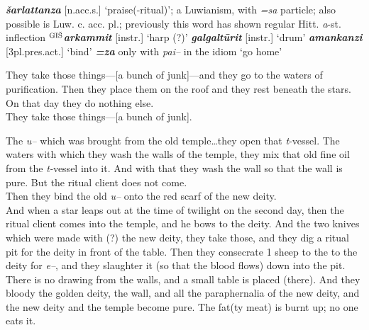\documentclass[10pt]{article}
\newcommand{\supersc}[1]{$^{\textrm{\scriptsize{#1}}}$}  	%
\newcommand{\bit}[1]{\textbf{\textit{#1}}}				%
\newcommand{\p}[1]{{\tiny[{#1}]}}					%
\newcommand{\hith}{\textsubwedge{h}}
\newcommand{\wood}{\supersc{GI\v{S}}}
\renewcommand{\.}[1]{\textsubdot{#1}}
\begin{document}
\begin{description}
\begin{notes}
\bit{\v{s}arlattanza} \p{n.acc.s.} `praise(-ritual)'; a Luwianism, with \textit{=sa} particle; also possible is Luw. c. acc. pl.; previously this word has shown regular Hitt. \textit{a}-st. inflection \textbf{\wood}\bit{arkammit} \p{instr.} `harp (?)' \bit{galgalt\=urit} \p{instr.} `drum' \bit{{\hith}amankanzi} \p{3pl.pres.act.} `bind' \bit{=za} only with \textit{pai--} in the idiom `go home'


\end{notes}


\item[\S\S29--30 :] They take those things---[a bunch of junk]---and they go to the waters of purification. Then they place them on the roof and they rest beneath the stars. On that day they do nothing else.  \\

They take those things---[a bunch of junk].


\begin{notes}



\end{notes}



\item[\S\S31--33 :] The \textit{u--} which was brought from the old temple{\ldots}they open that \textit{t}-vessel. The waters with which they wash the walls of the temple, they mix that old fine oil from the \textit{t-}vessel into it. And with that they wash the wall so that the wall is pure. But the ritual client does not come. \\

Then they bind the old \textit{u--} onto the red scarf of the new deity. \\

And when a star leaps out at the time of twilight on the second day, then the ritual client comes into the temple, and he bows to the deity. And the two knives which were made with (?) the new deity, they take those, and they dig a ritual pit for the deity in front of the table. Then they consecrate 1 sheep to the to the deity for \textit{e--}, and they slaughter it (so that the blood flows) down into the pit. There is no drawing from the walls, and a small table is placed (there). And they bloody the golden deity, the wall, and all the paraphernalia of the new deity, and the new deity and the temple become pure. The fat(ty meat) is burnt up; no one eats it. 


\begin{notes}


\end{notes}
\end{description}
\end{document}
